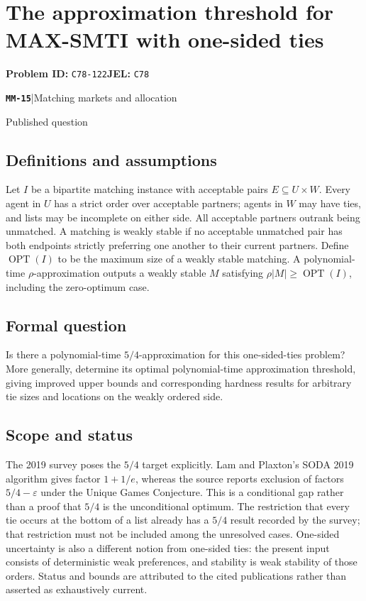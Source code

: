 \documentclass[11pt,a4paper]{article}
\newcommand{\entrymeta}[3]{{\sffamily\small\color{muted}\textbf{\texttt{#1}}\quad|\quad #2\par #3\par}}
\begin{document}
\section*{The approximation threshold for MAX-SMTI with one-sided ties}
\textbf{Problem ID:} \texttt{C78-122}\quad \textbf{JEL:} \texttt{C78}\par
\label{problem:OP-0556}
\label{beyond:MM-15}
\entrymeta{MM-15}{Matching markets and allocation}{Published question}
\subsection*{Definitions and assumptions}
Let $I$ be a bipartite matching instance with acceptable pairs $E\subseteq U\times W$. Every agent in $U$ has a strict order over acceptable partners; agents in $W$ may have ties, and lists may be incomplete on either side. All acceptable partners outrank being unmatched. A matching is weakly stable if no acceptable unmatched pair has both endpoints strictly preferring one another to their current partners. Define $\operatorname{OPT}(I)$ to be the maximum size of a weakly stable matching. A polynomial-time $\rho$-approximation outputs a weakly stable $M$ satisfying $\rho|M|\ge\operatorname{OPT}(I)$, including the zero-optimum case.
\subsection*{Formal question}
Is there a polynomial-time $5/4$-approximation for this one-sided-ties problem? More generally, determine its optimal polynomial-time approximation threshold, giving improved upper bounds and corresponding hardness results for arbitrary tie sizes and locations on the weakly ordered side.
\subsection*{Scope and status}
The 2019 survey poses the $5/4$ target explicitly. Lam and Plaxton's SODA 2019 algorithm gives factor $1+1/e$, whereas the source reports exclusion of factors $5/4-\varepsilon$ under the Unique Games Conjecture. This is a conditional gap rather than a proof that $5/4$ is the unconditional optimum. The restriction that every tie occurs at the bottom of a list already has a $5/4$ result recorded by the survey; that restriction must not be included among the unresolved cases. One-sided uncertainty is also a different notion from one-sided ties: the present input consists of deterministic weak preferences, and stability is weak stability of those orders. Status and bounds are attributed to the cited publications rather than asserted as exhaustively current.
\end{document}
